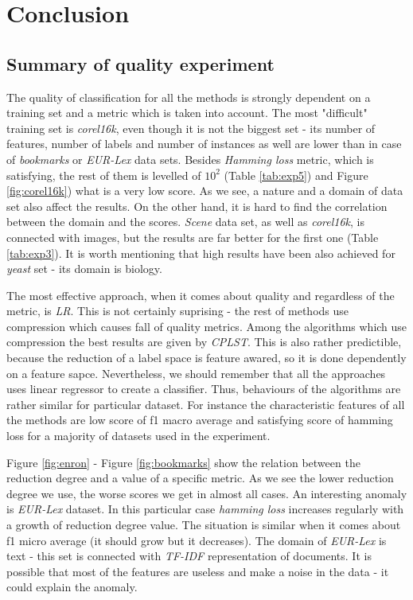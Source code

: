 \chapter{Conclusion}

\section{Summary of quality experiment}

The quality of classification for all the methods is strongly dependent on a training set and a metric which is taken into account. The most "difficult" training set is \textit{corel16k}, even though it is not the biggest set - its number of features, number of labels and number of instances as well are lower than in case of \textit{bookmarks} or \textit{EUR-Lex} data sets. Besides \textit{Hamming loss} metric, which is satisfying, the rest of them is levelled of $10^2$ (Table \ref{tab:exp5}) and Figure \ref{fig:corel16k}) what is a very low score. As we see, a nature and a domain of data set also affect the results. On the other hand, it is hard to find the correlation between the domain and the scores. \textit{Scene} data set, as well as \textit{corel16k}, is connected with images, but the results are far better for the first one (Table \ref{tab:exp3}). It is worth mentioning that high results have been also achieved for \textit{yeast} set - its domain is biology.

The most effective approach, when it comes about quality and regardless of the metric, is \textit{LR}. This is not certainly suprising - the rest of methods use compression which causes fall of quality metrics. Among the algorithms which use compression the best results are given by \textit{CPLST}. This is also rather predictible, because the reduction of a label space is feature awared, so it is done dependently on a feature sapce. Nevertheless, we should remember that all the approaches uses linear regressor to create a classifier. Thus, behaviours of the algorithms are rather similar for particular dataset. For instance the characteristic features of all the methods are low score of f1 macro average and satisfying score of hamming loss for a majority of datasets used in the experiment. 

Figure \ref{fig:enron} - Figure \ref{fig:bookmarks} show the relation between the reduction degree and a value of a specific metric. As we see the lower reduction degree we use, the worse scores we get in almost all cases. An interesting anomaly is \textit{EUR-Lex} dataset. In this particular case \textit{hamming loss} increases regularly with a growth of reduction degree value. The situation is similar when it comes about f1 micro average (it should grow but it decreases). The domain of \textit{EUR-Lex} is text - this set is connected with \textit{TF-IDF} representation of documents. It is possible that most of the features are useless and make a noise in the data - it could explain the anomaly.  

